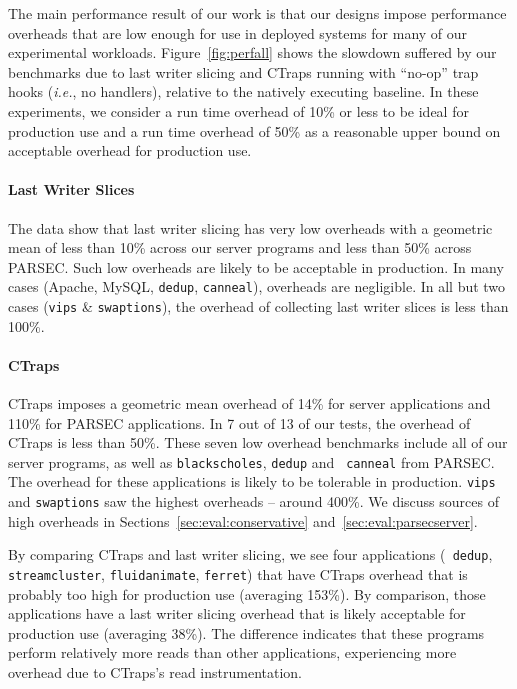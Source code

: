\documentclass[preprint,9pt]{sigplanconf}
\newcommand{\ctraps}{CTraps\xspace}
\begin{document}
The main performance result of our work is that our designs impose performance
overheads that are low enough for use in deployed systems for many of our
experimental workloads.  Figure~\ref{fig:perfall} shows the slowdown suffered
by our benchmarks due to last writer slicing and \ctraps running with ``no-op''
trap hooks ({\em i.e.}, no handlers), relative to the natively executing
baseline.  In these experiments, we consider a run time overhead of 10\% or
less to be ideal for production use and a run time overhead of 50\% as
a reasonable upper bound on acceptable overhead for production use.

\paragraph{Last Writer Slices}
The data show that last writer slicing has very low overheads with a geometric
mean of less than 10\% across our server programs and less than 50\% across
PARSEC.  Such low overheads are likely to be acceptable in production.  In many
cases (Apache, MySQL, {\tt dedup}, {\tt canneal}), overheads are negligible.
In all but two cases ({\tt vips} \& {\tt swaptions}), the overhead of
collecting last writer slices is less than 100\%.    

\paragraph{\ctraps}
\ctraps imposes a geometric mean overhead of 14\% for server applications and
110\% for PARSEC applications.  In 7 out of 13 of our tests, the overhead of
\ctraps is less than 50\%.  These seven low overhead benchmarks include all of
our server programs, as well as {\tt blackscholes}, {\tt dedup} and {\tt
canneal} from PARSEC.  The overhead for these applications is likely to be
tolerable in production.  {\tt vips} and {\tt swaptions} saw the highest
overheads -- around 400\%.  We discuss sources of high overheads in
Sections~\ref{sec:eval:conservative} and~\ref{sec:eval:parsecserver}.

By comparing \ctraps and last writer slicing, we see four applications ({\tt
dedup}, {\tt streamcluster}, {\tt fluidanimate}, {\tt ferret}) that have
\ctraps overhead that is probably too high for production use (averaging
153\%).  By comparison, those applications have a last writer slicing overhead
that is likely acceptable for production use (averaging 38\%).  The difference
indicates that these programs perform relatively more reads than other
applications, experiencing more overhead due to \ctraps's read instrumentation.
\end{document}
